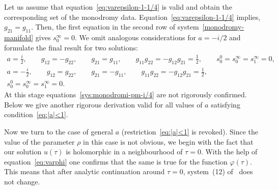\documentclass[pdftex]{sigma}
\numberwithin{equation}{section}
\begin{document}
Let us assume that equation~\eqref{eq:varepsilon-1-1/4} is valid and obtain the corresponding set of the monodromy
data. Equation~\eqref{eq:varepsilon-1-1/4} implies, $g_{21}=g_{11}$. Then, the first equation in the second row of
system~\eqref{monodromy-manifold} gives $s_0^{\infty}=0$. We omit analogous considerations for $a=-i/2$ and
formulate the final result for two solutions:
\begin{gather}
a=\frac{i}2, \qquad g_{12} =-g_{22},\qquad g_{21}=g_{11},\qquad g_{11}g_{22}=-g_{12}g_{21}=\frac12,\qquad s_0^0=s_0^\infty=s_1^\infty=0,\nonumber\\
 a=-\frac{i}2, \qquad g_{12} =g_{22},\qquad g_{21}=-g_{11},\qquad g_{11}g_{22}=-g_{12}g_{21}=\frac12,\nonumber\\
 s_0^0=s_0^\infty=s_1^\infty=0. \label{sys:monodromi-pm-i/4}
\end{gather}
At this stage equations~\eqref{sys:monodromi-pm-i/4} are not rigorously confirmed. Below we give another rigorous
derivation valid for all values of $a$ satisfying condition~\eqref{eq:|a|<1}.

Now we turn to the case of general $a$ (restriction~\eqref{eq:|a|<1} is revoked). Since the value of the parameter
$\rho$ in this case is not obvious, we begin with the fact that our solution $u(\tau)$ is holomorphic in a
neighbourhood of $\tau=0$. With the help of equation~\eqref{eq:varphi} one confirms that the same is true for the
function $\varphi(\tau)$. This means that after analytic continuation around $\tau=0$, system~(12) of~\cite{KV2004}
does not change.
\end{document}
